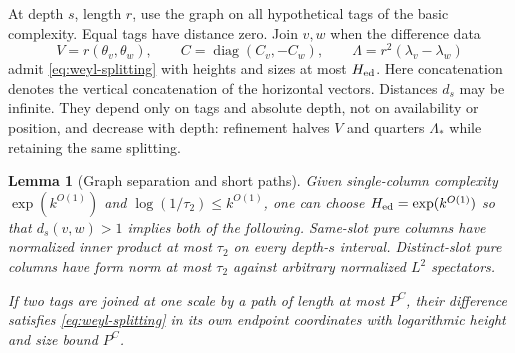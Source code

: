 \documentclass[11pt]{article}
\newtheorem{lemma}[theorem]{Lemma}
\theoremstyle{definition}
\numberwithin{equation}{section}
\begin{document}
At depth $s$, length $r$, use the graph on all hypothetical tags of the basic complexity. Equal tags have distance zero. Join $v,w$ when the difference data
\[
 V=r(\theta_v,\theta_w),\qquad C=\operatorname{diag}(C_v,-C_w),
 \qquad \Lambda=r^2(\lambda_v-\lambda_w)
\]
admit \eqref{eq:weyl-splitting} with heights and sizes at most $H_{\rm ed}$. Here concatenation denotes the vertical concatenation of the horizontal vectors. Distances $d_s$ may be infinite. They depend only on tags and absolute depth, not on availability or position, and decrease with depth: refinement halves $V$ and quarters $\Lambda_*$ while retaining the same splitting.

\begin{lemma}[Graph separation and short paths]\label{lem:graph}
Given single-column complexity $\exp(k^{O(1)})$ and $\log(1/\tau_2)\le k^{O(1)}$, one can choose $H_{\rm ed}=\exp(k^{O(1)})$ so that $d_s(v,w)>1$ implies both of the following. Same-slot pure columns have normalized inner product at most $\tau_2$ on every depth-$s$ interval. Distinct-slot pure columns have form norm at most $\tau_2$ against arbitrary normalized $L^2$ spectators.

If two tags are joined at one scale by a path of length at most $P^C$, their difference satisfies \eqref{eq:weyl-splitting} in its own endpoint coordinates with logarithmic height and size bound $P^C$.
\end{lemma}
\end{document}
